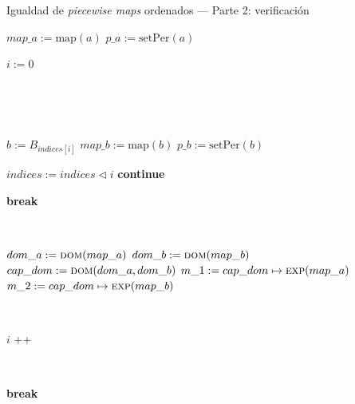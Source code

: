 \begin{algorithm}
\caption{Igualdad de \textit{piecewise maps} ordenados — Parte 2: verificación}
\label{alg:igualdad-ord2}
\begin{algorithmic}[1]
        \State  $map\_a := \mathrm{map}(a)$
        \State  $p\_a := \mathrm{setPer}(a)$
    \

        \State $i := 0$
                
    \
    
                
    \
    
            \State $b := B_{indices[i]}$
            \State  $map\_b := \mathrm{map}(b)$
            \State  $p\_b := \mathrm{setPer}(b)$
    \
    
                \State $indices := indices 	\triangleleft  i$
                \State \textbf{continue}
            \EndIf

                \State \textbf{break}
            \EndIf

\
            
                \State $dom\_a := \Call{dom}{map\_a}$
                \State $dom\_b := \Call{dom}{map\_b}$
                 \State $cap\_dom := \Call{dom}{dom\_a, dom\_b}$
                        \State $m\_1 := cap\_dom \mapsto \Call{exp}{map\_a}$
                        \State $m\_2 := cap\_dom \mapsto \Call{exp}{map\_b}$
                            \State {}
                        \EndIf
                    \Else
                            \State {}
                        \EndIf
                    \EndIf
                \EndIf
            \EndIf
            
        
    \
    
            \State $i$ \!+\!+ 
        \EndWhile
        
    \
    
            \State \textbf{break}
        \EndIf
    \EndFor
            
    \
    
    \State {}
\EndFunction
\end{algorithmic}
\end{algorithm}



